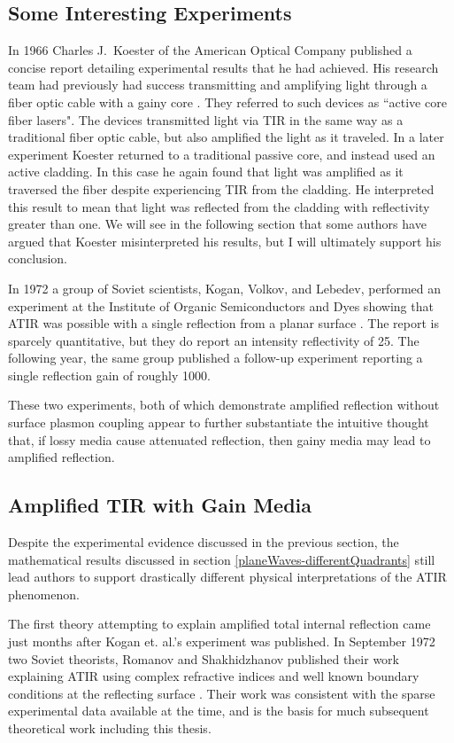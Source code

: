 \documentclass[12pt]{uthesis-v12}
\begin{document}
\subsection{Some Interesting Experiments}\label{intro-experiments}
In 1966 Charles J.~Koester of the American Optical Company published a concise report detailing experimental results that he had achieved. His research team had previously had success transmitting and amplifying light through a fiber optic cable with a gainy core \cite{FiberExperiment}. They referred to such devices as ``active core fiber lasers". The devices transmitted light via TIR in the same way as a traditional fiber optic cable, but also amplified the light as it traveled.  In a later experiment Koester returned to a traditional passive core, and instead used an active cladding. In this case he again found that light was amplified as it traversed the fiber despite experiencing TIR from the cladding.  He interpreted this result to mean that light was reflected from the cladding with reflectivity greater than one. We will see in the following section that some authors have argued that Koester misinterpreted his results, but I will ultimately support his conclusion.

In 1972 a group of Soviet scientists, Kogan, Volkov, and Lebedev, performed an experiment at the Institute of Organic Semiconductors and Dyes showing that ATIR was possible with a single reflection from a planar surface \cite{Kogan1}. The report is sparcely quantitative, but they do report an intensity reflectivity of 25. The following year, the same group published a follow-up experiment reporting a single reflection gain of roughly 1000\cite{Kogan2}.

These two experiments, both of which demonstrate amplified reflection without surface plasmon coupling appear to further substantiate the intuitive thought that, if lossy media cause attenuated reflection, then gainy media may lead to amplified reflection.

\subsection{Amplified TIR with Gain Media}
Despite the experimental evidence discussed in the previous section, the mathematical results discussed in section \ref{planeWaves-differentQuadrants} still lead authors to support drastically different physical interpretations of the ATIR phenomenon.

The first theory attempting to explain amplified total internal reflection came just months after Kogan et. al.'s experiment was published. In September 1972 two Soviet theorists, Romanov and Shakhidzhanov published their work explaining ATIR using complex refractive indices and well known boundary conditions at the reflecting surface \cite{Romanov}. Their work was consistent with the sparse experimental data available at the time, and is the basis for much subsequent theoretical work including this thesis.
\end{document}
